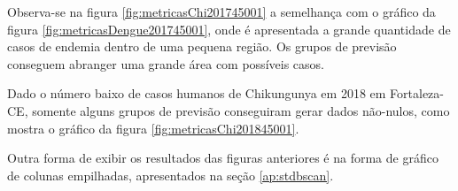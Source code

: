 Observa-se na figura \ref{fig:metricasChi201745001} a semelhança com o gráfico da figura \ref{fig:metricasDengue201745001}, onde é apresentada a grande quantidade de casos de endemia dentro de uma pequena região. Os grupos de previsão conseguem abranger uma grande área com possíveis casos.
\begin{figure}[!ht]
	\centering	
\end{figure}
\FloatBarrier

Dado o número baixo de casos humanos de Chikungunya em 2018 em Fortaleza-CE, somente alguns grupos de previsão conseguiram gerar dados não-nulos, como mostra o gráfico da figura \ref{fig:metricasChi201845001}.
\begin{figure}[!ht]
	\centering	
\end{figure}
\FloatBarrier

Outra forma de exibir os resultados das figuras anteriores é na forma de gráfico de colunas empilhadas, apresentados na seção \ref{ap:stdbscan}.

